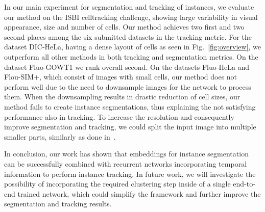 \documentclass[runningheads,a4paper]{llncs}
\begin{document}




In our main experiment for segmentation and tracking of instances, we evaluate our method on the ISBI celltracking challenge, showing large variability in visual appearance, size and number of cells.
Our method achieves two first and two second places among the six submitted datasets in the tracking metric.
For the dataset DIC-HeLa, having a dense layout of cells as seen in Fig.~\ref{fig:overview}, we outperform all other methods in both tracking and segmentation metrics. %
On the dataset Fluo-GOWT1 we rank overall second.
On the datasets Fluo-HeLa and Flou-SIM+, which consist of images with small cells, our method does not perform well due to  the need to downsample images for the network to process them.
When the downsampling results in drastic reduction of cell sizes, our method fails to create instance segmentations, %
thus explaining the not satisfying performance also in tracking.
To increase the resolution and consequently improve segmentation and tracking, we could split the input image into multiple smaller parts, similarly as done in~\cite{Ronneberger2015}.

In conclusion, our work has shown that embeddings for instance segmentation can be successfully combined with recurrent networks incorporating temporal information to perform instance tracking.
In future work, we will investigate the possibility of incorporating the required clustering step inside of a single end-to-end trained network, which could simplify the framework and further improve the segmentation and tracking results.
\end{document}
